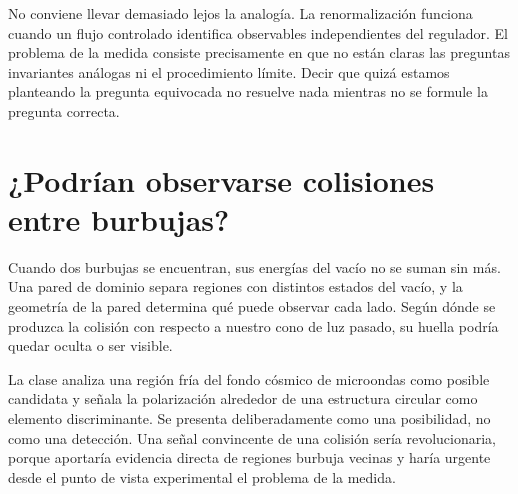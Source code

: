 No conviene llevar demasiado lejos la analogía. La renormalización funciona cuando un flujo controlado identifica observables independientes del regulador. El problema de la medida consiste precisamente en que no están claras las preguntas invariantes análogas ni el procedimiento límite. Decir que quizá estamos planteando la pregunta equivocada no resuelve nada mientras no se formule la pregunta correcta.

\begin{classroomqa}
\end{classroomqa}

\section{¿Podrían observarse colisiones entre burbujas?}

Cuando dos burbujas se encuentran, sus energías del vacío no se suman sin más. Una pared de dominio separa regiones con distintos estados del vacío, y la geometría de la pared determina qué puede observar cada lado. Según dónde se produzca la colisión con respecto a nuestro cono de luz pasado, su huella podría quedar oculta o ser visible.

\begin{classroomqa}
\end{classroomqa}

La clase analiza una región fría del fondo cósmico de microondas como posible candidata y señala la polarización alrededor de una estructura circular como elemento discriminante. Se presenta deliberadamente como una posibilidad, no como una detección. Una señal convincente de una colisión sería revolucionaria, porque aportaría evidencia directa de regiones burbuja vecinas y haría urgente desde el punto de vista experimental el problema de la medida.

